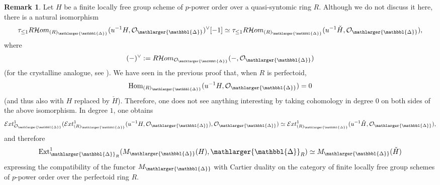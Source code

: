 \documentclass{amsart}
\newcommand{\prism}{{\mathlarger{\mathbbl{\Delta}}}}
\theoremstyle{plain}
\theoremstyle{definition}
\newtheorem{remark}[theorem]{Remark}
\newcommand{\F}{\mathbb{F}}
\newcommand{\Z}{\mathbb{Z}}
\newcommand{\Ext}{\mathcal{E}xt}
\newcommand{\purple}[1]{{\color{black} #1}}
\begin{document}
\iffalse
\begin{remark} \label{cartier_duality_finite_loc_free}
\purple{Let $H$ be a finite locally free group scheme of $p$-power order over a quasi-syntomic ring $R$. Although we do not discuss it here, there is a natural isomorphism
\[  \tau_{\leq 1} R\mathcal{H}om_{(R)_{\prism}}(u^{-1} H, \mathcal{O}_{\prism})^{\vee}[-1] \simeq \tau_{\leq 1} R\mathcal{H}om_{(R)_{\prism}}(u^{-1} \check{H}, \mathcal{O}_{\prism}), \]
where
$$(-)^{\vee}:=R\mathcal{H}om_{\mathcal{O}_{\prism}}(-,\mathcal{O}_{\prism})$$
(for the crystalline analogue, see \cite[Theorem 5.2.7]{berthelot_breen_messing_theorie_de_dieudonne_cristalline_II}). We have seen in the previous proof that, when $R$ is perfectoid,
\[ \mathrm{Hom}_{(R)_{\prism}}(u^{-1} H, \mathcal{O}_{\prism}) = 0 \]
(and thus also with $H$ replaced by $\check{H}$). Therefore, one does not see anything interesting by taking cohomology in degree $0$ on both sides of the above isomorphism. In degree $1$, one obtains
\[ \Ext_{\mathcal{O}_{\prism}}^1(\Ext_{(R)_{\prism}}^1(u^{-1} H, \mathcal{O}_{\prism}), \mathcal{O}_{\prism}) \simeq \Ext_{(R)_{\prism}}^1(u^{-1} \check{H}, \mathcal{O}_{\prism}), \]
and therefore
\[ \mathrm{Ext}_{\prism_R}^1(M_{\prism}(H), \prism_R) \simeq M_{\prism}(\check{H}) \]
expressing the compatibility of the functor $M_{\prism}$ with Cartier duality on the category of finite locally free group schemes of $p$-power order over the perfectoid ring $R$.}

\end{remark}
\end{document}
